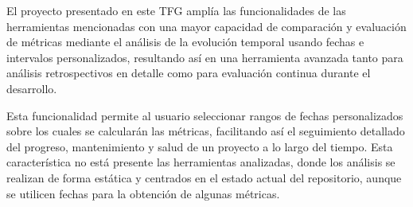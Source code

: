 \begin{table}[H]
	\centering
	\renewcommand{\arraystretch}{1.5}
	\caption{Comparación de herramientas y trabajos relacionados}
	\label{comparacion_trabajos}
\end{table}

El proyecto presentado en este TFG amplía las funcionalidades de las herramientas mencionadas con una mayor capacidad de comparación y evaluación de métricas mediante el análisis de la evolución temporal usando fechas e intervalos personalizados, resultando así en una herramienta avanzada tanto para análisis retrospectivos en detalle como para evaluación continua durante el desarrollo.

Esta funcionalidad permite al usuario seleccionar rangos de fechas personalizados sobre los cuales se calcularán las métricas, facilitando así el seguimiento detallado del progreso, mantenimiento y salud de un proyecto a lo largo del tiempo. Esta característica no está presente las herramientas analizadas, donde los análisis se realizan de forma estática y centrados en el estado actual del repositorio, aunque se utilicen fechas para la obtención de algunas métricas.

